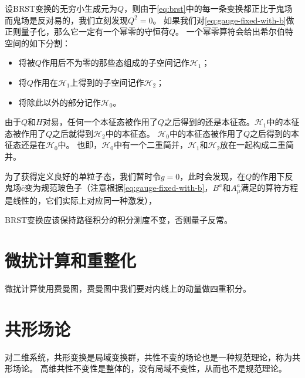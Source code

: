 \documentclass[hyperref, UTF8, a4paper]{ctexart}
\begin{document}
设BRST变换的无穷小生成元为$Q$，则由于\eqref{eq:brst}中的每一条变换都正比于鬼场而鬼场是反对易的，我们立刻发现$Q^2=0$。
如果我们对\eqref{eq:gauge-fixed-with-b}做正则量子化，那么它一定有一个幂零的守恒荷$Q$。
一个幂零算符会给出希尔伯特空间的如下分割：
\begin{itemize}
    \item 将被$Q$作用后不为零的那些态组成的子空间记作$\mathcal{H}_1$；
    \item 将$Q$作用在$\mathcal{H}_1$上得到的子空间记作$\mathcal{H}_2$；
    \item 将除此以外的部分记作$\mathcal{H}_0$。
\end{itemize}
由于$Q$和$H$对易，任何一个本征态被作用了$Q$之后得到的还是本征态。$\mathcal{H}_1$中的本征态被作用了$Q$之后就得到$\mathcal{H}_2$中的本征态。
$\mathcal{H}_0$中的本征态被作用了$Q$之后得到的本征态还是在$\mathcal{H}_0$中。
也即，$\mathcal{H}_0$中有一个二重简并，$\mathcal{H}_1$和$\mathcal{H}_2$放在一起构成二重简并。

为了获得定义良好的单粒子态，我们暂时令$g=0$，此时会发现，在$Q$的作用下反鬼场$\bar{c}$变为规范玻色子（注意根据\eqref{eq:gauge-fixed-with-b}，$B^a$和$A^a_\mu$满足的算符方程是线性的，它们实际上对应同一种激发），

BRST变换应该保持路径积分的积分测度不变，否则量子反常。

\section{微扰计算和重整化}

微扰计算使用费曼图，费曼图中我们要对内线上的动量做四重积分。

\section{共形场论}

对二维系统，共形变换是局域变换群，共性不变的场论也是一种规范理论，称为共形场论。
高维共性不变性是整体的，没有局域不变性，从而也不是规范理论。
\end{document}
